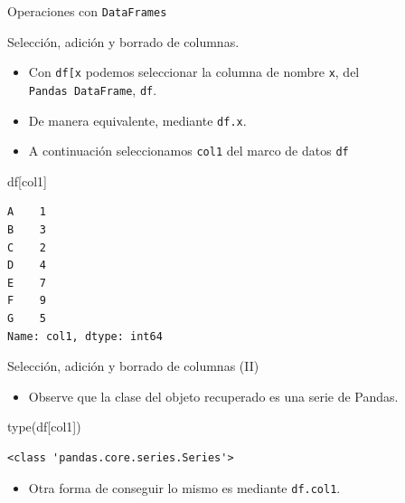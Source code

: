 \documentclass[
  ignorenonframetext,
  aspectratio=169,
  spanish,
]{beamer}
\newenvironment{Shaded}{\begin{snugshade}}{\end{snugshade}}
\newcommand{\BuiltInTok}[1]{\textcolor[rgb]{0.00,0.23,0.31}{#1}}
\newcommand{\NormalTok}[1]{\textcolor[rgb]{0.00,0.23,0.31}{#1}}
\newcommand{\StringTok}[1]{\textcolor[rgb]{0.13,0.47,0.30}{#1}}
\providecommand{\tightlist}{%
  \setlength{\itemsep}{0pt}\setlength{\parskip}{0pt}}
\begin{document}
\begin{frame}[fragile]{Operaciones con \texttt{DataFrames}}
\begin{block}{Selección, adición y borrado de columnas.}
\label{selecciuxf3n-adiciuxf3n-y-borrado-de-columnas.}
\begin{itemize}
\item
  Con \texttt{df{[}\textquotesingle{}x\textquotesingle{}{]}} podemos
  seleccionar la columna de nombre \texttt{x}, del
  \texttt{Pandas\ DataFrame}, \texttt{df}.
\item
  De manera equivalente, mediante \texttt{df.x}.
\item
  A continuación seleccionamos \texttt{col1} del marco de datos
  \texttt{df}
\end{itemize}

\begin{Shaded}
\begin{Highlighting}[]
\NormalTok{df[}\StringTok{\textquotesingle{}col1\textquotesingle{}}\NormalTok{] }
\end{Highlighting}
\end{Shaded}

\begin{verbatim}
A    1
B    3
C    2
D    4
E    7
F    9
G    5
Name: col1, dtype: int64
\end{verbatim}
\end{block}

\begin{block}{Selección, adición y borrado de columnas (II)}
\label{selecciuxf3n-adiciuxf3n-y-borrado-de-columnas-ii}
\begin{itemize}
\tightlist
\item
  Observe que la clase del objeto recuperado es una serie de Pandas.
\end{itemize}

\begin{Shaded}
\begin{Highlighting}[]
\BuiltInTok{type}\NormalTok{(df[}\StringTok{\textquotesingle{}col1\textquotesingle{}}\NormalTok{])}
\end{Highlighting}
\end{Shaded}

\begin{verbatim}
<class 'pandas.core.series.Series'>
\end{verbatim}

\begin{itemize}
\tightlist
\item
  Otra forma de conseguir lo mismo es mediante \texttt{df.col1}.
\end{itemize}
\end{block}


\end{frame}
\end{document}
